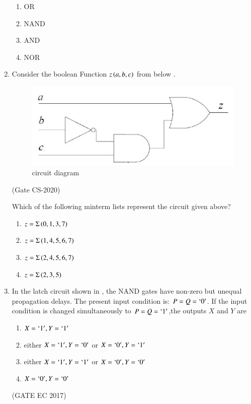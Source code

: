 \begin{enumerate}[label=\arabic*.,ref=\theenumi]
	\begin{enumerate}
       \item OR
       \item NAND
       \item AND
       \item NOR
   \end{enumerate}
\item Consider the boolean Function $z\left(a,b,c\right)$ from below 
			.
		\begin{figure}[H]
			\centering
			\includegraphics[width=0.75\columnwidth]{figs/203.png}
			\caption{circuit diagram}
			\label{fig:203}
		\end{figure}
		
	\hfill{(Gate CS-2020)}
	
		Which of the following minterm lists represent the circuit given above?
	\begin{enumerate}
		\item $z=\Sigma\left(0,1,3,7\right)$
		\item $z=\Sigma\left(1,4,5,6,7\right)$
		\item $z=\Sigma\left(2,4,5,6,7\right)$
		\item $z=\Sigma\left(2,3,5\right)$
	\end{enumerate}	   
\item In the latch circuit shown
in
, the NAND gates have non-zero but unequal propagation delays. The present input condition is: $P=Q=\lq 0\rq$. If the input condition is changed simultaneously to $P=Q=\lq 1\rq$,the outputs $X$ and $Y$ are 
\begin{figure}[H]
\centering
\resizebox{\columnwidth}{!}{%

	}
	\caption{}
\label{figure_1}
\end{figure}
\begin{enumerate}
\item $X=\lq 1\rq,Y=\lq 1 \rq$
\item either $X=\lq 1\rq,Y=\lq 0\rq$ or $X=\lq 0\rq,Y=\lq 1\rq$
\item either $X=\lq 1\rq,Y=\lq 1\rq$ or $X=\lq 0\rq,Y=\lq 0\rq$
\item $X=\lq 0\rq,Y=\lq 0 \rq$
\end{enumerate}
\hfill(GATE EC 2017)


\end{enumerate}
